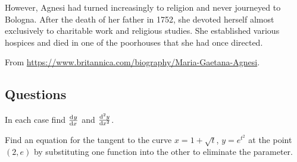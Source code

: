 However, Agnesi had turned increasingly to religion and never journeyed to Bologna. After the death of her father in 1752, she devoted herself almost exclusively to charitable work and religious studies. She established various hospices and died in one of the poorhouses that she had once directed.

\begin{flushright}
  From \url{https://www.britannica.com/biography/Maria-Gaetana-Agnesi}.
\end{flushright}

\subsection*{Questions}
\begin{questions}
  \question In each case find $ \od{y}{x} $ and $ \od[2]{y}{x} $.
  \question Find an equation for the tangent to the curve $ x = 1 + \sqrt{t} $, $ y = e^{t^2} $ at the point $ (2,e) $ by
            substituting one function into the other to eliminate the parameter.
  \question
\end{questions}

